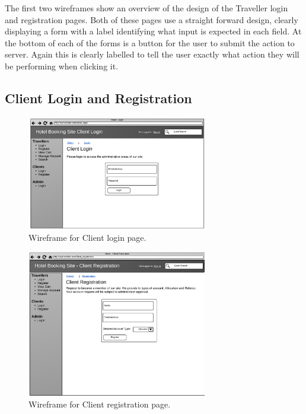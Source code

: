 \documentclass{article}
\begin{document}
The first two wireframes show an overview of the design of the Traveller login and registration pages. Both of these pages use a straight forward design, clearly displaying a form with a label identifying what input is expected in each field. At the bottom of each of the forms is a button for the user to submit the action to server. Again this is clearly labelled to tell the user exactly what action they will be performing when clicking it.

\subsection{Client Login and Registration}

\begin{figure}[H]
\centering
\includegraphics[width=0.7\textwidth]{img/wireframes/ClientLogin.png}
\caption{Wireframe for Client login page.}
\label{fig:wireframe-client-login}
\end{figure}

\begin{figure}[H]
\centering
\includegraphics[width=0.7\textwidth]{img/wireframes/ClientRegister.png}
\caption{Wireframe for Client registration page.}
\label{fig:wireframe-client-register}
\end{figure}
\end{document}
